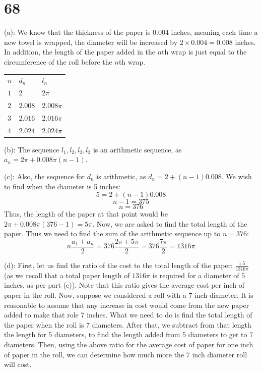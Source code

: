 \documentclass{article}
\theoremstyle{definition}
\newcommand{\?}{\stackrel{?}{=}}
\begin{document}
\section*{68}
(a): We know that the thickness of the paper is $0.004$ inches, meaning each time a new towel is wrapped, the diameter will be increased by $2\times 0.004=0.008$ inches. In addition, the length of the 
paper added in the $n$th wrap is just equal to the circumference of the roll before the $n$th wrap. 
\begin{center}
\begin{tabular}{lll}
$n$ & $d_n$ & $l_n$ \\
$1$ & $2$ & $2\pi$ \\
$2$ & $2.008$ & $2.008\pi$ \\
$3$ & $2.016$ & $2.016\pi$ \\
$4$ & $2.024$ & $2.024\pi$ \\
\end{tabular}
\end{center}


(b): The sequence $l_1,l_2,l_3,l_3$ is an arithmetic sequence, as $a_n=2\pi+0.008\pi (n-1)$.


(c): Also, the sequence for $d_n$ is arithmetic, as $d_n=2+(n-1)0.008$. We wish to find when the diameter is 5 inches:
\[ 5=2+(n-1)0.008 \] \[ n-1=375 \] \[ n=376 \] Thus, the length of the paper at that point would be $2\pi+0.008\pi (376-1)=5\pi$.
Now, we are asked to find the total length of the paper. 
Thus we need to find the sum of the arithmetic sequence up to $n=376$: \[ n\frac{a_1+a_n}{2}=376\frac{2\pi+5\pi}{2}=376\frac{7\pi}{2}=1316\pi \]


(d): First, let us find the ratio of the cost to the total length of the paper: $\frac{1.5}{1316\pi}$ (as we recall that a total paper length of $1316\pi$ is 
required for a diameter of $5$ inches, as per part (c)). Note that this ratio gives the average cost per inch of paper in the roll. 
Now, suppose we considered a roll with a 7 inch diameter. It is reasonable to assume that any increase in cost would 
come from the new paper added to make that role 7 inches. What we need to do is find the total length of the paper when the roll is 7 diameters. After that, we subtract from 
that length the length for 5 diameters, to find the length added from 5 diameters to get to 7 diameters. Then, using the above ratio for the average cost of 
paper for one inch of paper in the roll, we can determine how much more the 7 inch diameter roll will cost. 
\end{document}
